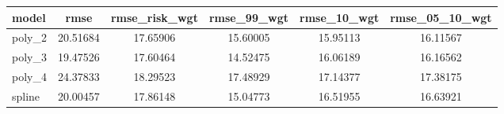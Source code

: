 \documentclass[]{article}
\begin{document}
\begin{tabular}{lccccc} \hline
model & rmse & rmse\_risk\_wgt & rmse\_99\_wgt & rmse\_10\_wgt & rmse\_05\_10\_wgt \\ \hline
poly\_2 & 20.51684 & 17.65906 & 15.60005 & 15.95113 & 16.11567 \\
poly\_3 & 19.47526 & 17.60464 & 14.52475 & 16.06189 & 16.16562 \\
poly\_4 & 24.37833 & 18.29523 & 17.48929 & 17.14377 & 17.38175 \\
 spline & 20.00457 & 17.86148 & 15.04773 & 16.51955 & 16.63921 \\ \hline
\end{tabular}
\end{document}
